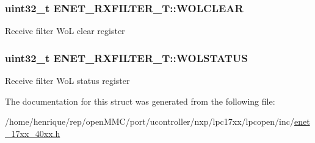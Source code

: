 \hypertarget{structENET__RXFILTER__T_acc4b5d489de8f522d567436de4b10d91}{
\subsubsection[{W\-O\-L\-C\-L\-E\-A\-R}]{ uint32\-\_\-t E\-N\-E\-T\-\_\-\-R\-X\-F\-I\-L\-T\-E\-R\-\_\-\-T\-::\-W\-O\-L\-C\-L\-E\-A\-R}}\label{structENET__RXFILTER__T_acc4b5d489de8f522d567436de4b10d91}
Receive filter Wo\-L clear register \hypertarget{structENET__RXFILTER__T_a40eedf8542d1e384d39cc5fca3fffffb}{
\subsubsection[{W\-O\-L\-S\-T\-A\-T\-U\-S}]{ uint32\-\_\-t E\-N\-E\-T\-\_\-\-R\-X\-F\-I\-L\-T\-E\-R\-\_\-\-T\-::\-W\-O\-L\-S\-T\-A\-T\-U\-S}}\label{structENET__RXFILTER__T_a40eedf8542d1e384d39cc5fca3fffffb}
Receive filter Wo\-L status register 

The documentation for this struct was generated from the following file\-:\begin{DoxyCompactItemize}
\item 
/home/henrique/rep/open\-M\-M\-C/port/ucontroller/nxp/lpc17xx/lpcopen/inc/\hyperlink{enet__17xx__40xx_8h}{enet\-\_\-17xx\-\_\-40xx.\-h}\end{DoxyCompactItemize}
